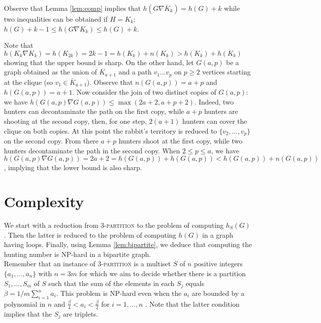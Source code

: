 \documentclass[runningheads]{llncs}
\begin{document}
Observe that Lemma \ref{lem:comp} implies that $h(G \nabla \overline{K}_k) = h(G) + k$ while two inequalities can be obtained if $H = K_k$:   
$h(G) + k -1 \leq h(G \nabla {K}_k) \leq h(G) + k$.
{Note that $h(K_k \nabla {K}_k)=h(K_{2k})=2k-1=h(K_k)+n(K_k)>h(K_k)+h(K_k)$ showing that the upper bound is sharp. 
On the other hand, let $G(a,p)$ be a graph obtained as the union of  {$\overline{K}_{a+1}$ and a path $v_1...v_p$  on $p \geq 2$ vertices starting at the clique (so $v_1 \in \overline{K}_{a+1}$). Observe that $n(G(a,p)) = a+p$ and $h(G(a,p)) = a+1$.}   Now consider the join of two distinct copies of $G(a,p)$: we have $h(G(a,p) \nabla G(a,p))\le \max(2a+2,a+p+2)$. Indeed, two hunters can decontaminate the path on the first copy, while $a+p$ hunters {are shooting at} 
the second copy, then, for one step, $2(a+1)$ hunters can cover the clique
on both copies.
At this point the %
{rabbit's} territory is reduced to $\{v_2,...,v_p\}$ on the second copy. From there $a+p$ hunters {shoot at} 
the  first copy, while two hunters decontaminate the path in the second copy. When {$2 \leq p\le a$, we have $ h(G(a,p) \nabla G(a,p))=2a+2=h(G(a,p))+h(G(a,p))<h(G(a,p))+n(G(a,p))$, implying that the lower bound is also  sharp.} 


\section{Complexity}




We start with a reduction from \textsc{3-partition} to the problem of computing $h_S(G)$. Then the latter is reduced to the problem of computing $h(G)$ in a graph having loops. Finally, using Lemma \ref{lem:bipartite}, we deduce that computing the hunting number is NP-hard in a bipartite graph.\\
Remember that an instance of \textsc{3-partition} is a multiset $S$ of $n$ positive integers $\{a_1,...,a_n\}$ with $n=3m$ for which we aim to decide whether there is a partition $S_1,...,S_m$ of $S$ such that the sum of the elements in each $S_j$ equals $\beta = 1/m \sum_{i=1}^n a_i$.
This problem is NP-hard even when the $a_i$ are bounded by a polynomial in $n$ and $\frac{\beta}{4} < a_i < \frac{\beta}{2}$ for $i=1,...,n$ \cite{gareyjohnson79}. Note that the latter condition implies that the $S_j$ are triplets.}
\end{document}
